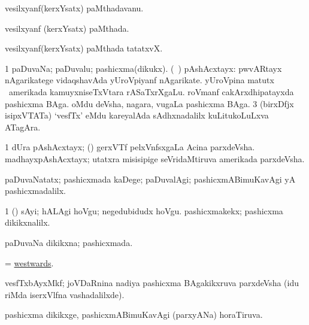\bentry
{} 
\gl{\nA}
\expl{}
\bmng
vesilxyanf(kerxYsatx) paMthadavanu. 
\emng
\eentry

\bentry
{} 
\gl{\gu}
\expl{}
 vesilxyanf (kerxYsatx) paMthada. 
\emng
\eentry

\bentry
{} 
\gl{\nA}
\expl{}
\bmng
vesilxyanf(kerxYsatx) paMthada tatatxvX. 
\emng
\eentry

\bentry
{} 
\gl{\nA}
\expl{}
\bmng
\bnum
\num{1} paDuvaNa; paDuvalu; pashicxma(dikukx). 
 (\sA\ ) pAshAcxtayx: 
\banum
{} pwvARtayx nAgarikatege vidaqshavAda yUroVpiyanf nAgarikate. 
 yUroVpina matutx \kanu\ amerikada kamuyxniseTxVtara rASaTxrXgaLu. 
 roVmanf cakArxdhipatayxda pashicxma BAga. 
 oMdu deVsha, nagara, \mo vugaLa pashicxma BAga. 
\eanum
\numie
\num{3} (birxDfjx isipxVTATa) `vesfTx' eMdu kareyalAda sAdhxnadalilx kuLitukoLuLxva ATagAra. 
\enum
\emng

\noindent 
\gl{\pagu}
\expl{}
\bmng
\bnum
\num{1}  dUra pAshAcxtayx; (\ame) gerxVTf pelxVnfsxgaLa Acina parxdeVsha.  madhayxpAshAcxtayx; utatxra misisipige seVridaMtiruva amerikada parxdeVsha. 
\enum
\emng
\eentry

\bentry
{} 
\gl{\kirxvi}
\expl{}
\bmng
paDuvaNatatx; pashicxmada kaDege; paDuvalAgi; pashicxmABimuKavAgi yA pashicxmadalilx. 
\emng

\noindent 
\gl{\pagu}
\expl{}
\bmng
\bnum
\num{1}  (\ashi) sAyi; hALAgi hoVgu; negedubidudx hoVgu.  pashicxmakekx; pashicxma dikikxnalilx. 
\enum
\emng
\eentry

\bentry
{} 
\gl{\gu}
\expl{}
\bmng
paDuvaNa dikikxna; pashicxmada. 
\emng
\eentry

\bentry
{} 
\gl{\kirxvi}
\expl{}
\bmng
= \hyperlink{westwards}{westwards}. 
\emng
\eentry

\bentry
{} 
\gl{\nA}
\expl{}
\bmng
vesfTxbAyxMkf; joVDaRnina nadiya pashicxma BAgakikxruva parxdeVsha (idu riMda iserxVlfna vashadalilxde). 
\emng
\eentry

\bentry
{} 
\gl{\gu}
\expl{}
\bmng
pashicxma dikikxge, pashicxmABimuKavAgi (parxyANa) horaTiruva. 
\emng
\eentry

